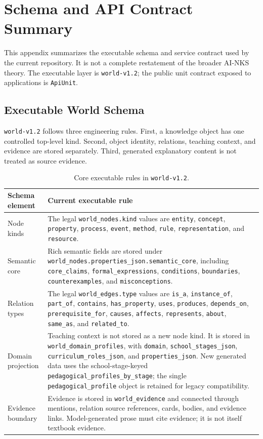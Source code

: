 \documentclass[11pt,letterpaper]{article}
\newcommand{\code}[1]{\nolinkurl{#1}}
\newcommand{\AINKS}{AI-NKS}
\begin{document}
\newpage

\section{Schema and API Contract Summary}
\label{app:schema-api}

This appendix summarizes the executable schema and service contract used by the current repository. It is not a complete restatement of the broader \AINKS{} theory. The executable layer is \code{world-v1.2}; the public unit contract exposed to applications is \code{ApiUnit}.

\subsection{Executable World Schema}

\code{world-v1.2} follows three engineering rules. First, a knowledge object has one controlled top-level kind. Second, object identity, relations, teaching context, and evidence are stored separately. Third, generated explanatory content is not treated as source evidence.

\begin{table}[H]
\centering
\small
\begin{tabularx}{\textwidth}{@{}p{}Y@{}}
\toprule
Schema element & Current executable rule\\
\midrule
Node kinds & The legal \code{world_nodes.kind} values are \code{entity}, \code{concept}, \code{property}, \code{process}, \code{event}, \code{method}, \code{rule}, \code{representation}, and \code{resource}.\\
Semantic core & Rich semantic fields are stored under \code{world_nodes.properties_json.semantic_core}, including \code{core_claims}, \code{formal_expressions}, \code{conditions}, \code{boundaries}, \code{counterexamples}, and \code{misconceptions}.\\
Relation types & The legal \code{world_edges.type} values are \code{is_a}, \code{instance_of}, \code{part_of}, \code{contains}, \code{has_property}, \code{uses}, \code{produces}, \code{depends_on}, \code{prerequisite_for}, \code{causes}, \code{affects}, \code{represents}, \code{about}, \code{same_as}, and \code{related_to}.\\
Domain projection & Teaching context is not stored as a new node kind. It is stored in \code{world_domain_profiles}, with \code{domain}, \code{school_stages_json}, \code{curriculum_roles_json}, and \code{properties_json}. New generated data uses the school-stage-keyed \code{pedagogical_profiles_by_stage}; the single \code{pedagogical_profile} object is retained for legacy compatibility.\\
Evidence boundary & Evidence is stored in \code{world_evidence} and connected through mentions, relation source references, cards, bodies, and evidence links. Model-generated prose must cite evidence; it is not itself textbook evidence.\\
\bottomrule
\end{tabularx}
\caption{Core executable rules in \code{world-v1.2}.}
\label{tab:world-v12-rules}
\end{table}
\end{document}
